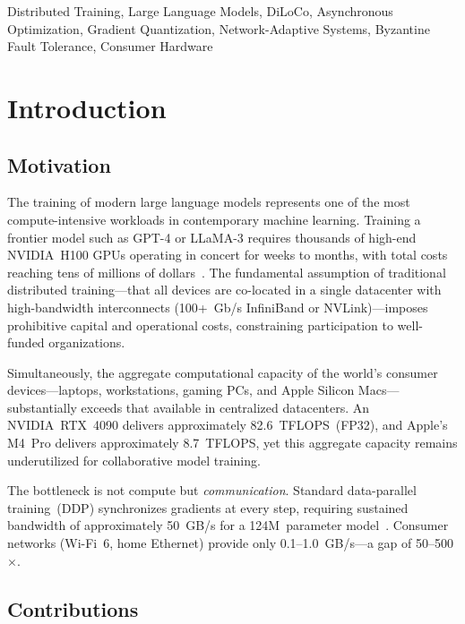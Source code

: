 \documentclass[10pt,conference]{IEEEtran}
\begin{document}
\begin{IEEEkeywords}
Distributed Training, Large Language Models, DiLoCo, Asynchronous
Optimization, Gradient Quantization, Network-Adaptive Systems, Byzantine
Fault Tolerance, Consumer Hardware
\end{IEEEkeywords}

\section{Introduction}
\label{sec:introduction}

\subsection{Motivation}

The training of modern large language models represents one of the most
compute-intensive workloads in contemporary machine learning. Training a
frontier model such as GPT-4 or LLaMA-3 requires thousands of high-end
NVIDIA~H100 GPUs operating in concert for weeks to months, with total costs
reaching tens of millions of dollars~\cite{touvron2023llama}. The fundamental
assumption of traditional distributed training---that all devices are
co-located in a single datacenter with high-bandwidth interconnects
(100+~Gb/s InfiniBand or NVLink)---imposes prohibitive capital and operational
costs, constraining participation to well-funded organizations.

Simultaneously, the aggregate computational capacity of the world's consumer
devices---laptops, workstations, gaming PCs, and Apple Silicon
Macs---substantially exceeds that available in centralized datacenters. An
NVIDIA~RTX~4090 delivers approximately 82.6~TFLOPS~(FP32), and Apple's M4~Pro
delivers approximately 8.7~TFLOPS, yet this aggregate capacity remains
underutilized for collaborative model training.

The bottleneck is not compute but \emph{communication}. Standard data-parallel
training~(DDP) synchronizes gradients at every step, requiring sustained
bandwidth of approximately 50~GB/s for a 124M~parameter
model~\cite{rajbhandari2020zero}. Consumer networks (Wi-Fi~6, home Ethernet)
provide only 0.1--1.0~GB/s---a gap of 50--500$\times$.

\subsection{Contributions}
\end{document}
